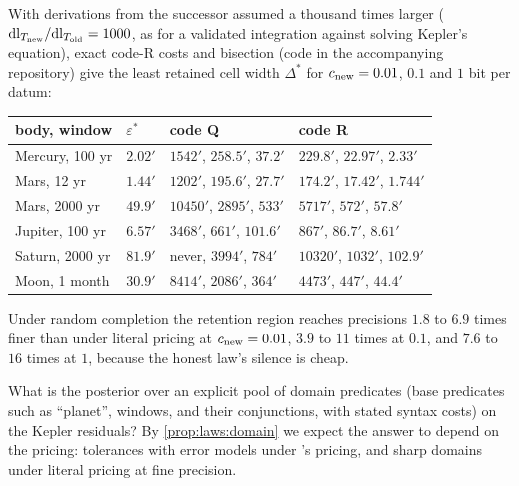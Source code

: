 With derivations from the successor assumed a thousand times larger ($\mathrm{dl}_{T_{\rm new}}/\mathrm{dl}_{T_{\rm old}}=1000$, as for a validated integration against solving Kepler's equation), exact code-R costs and bisection (code in the accompanying repository) give the least retained cell width $\Delta^*$ for $c_{\rm new}=0.01$, $0.1$ and $1$ bit per datum:
\begin{center}\small
\begin{tabular}{llll}
\toprule
body, window & $\varepsilon^*$ & code Q & code R\\
\midrule
Mercury, 100 yr & $2.02'$ & $1542'$, $258.5'$, $37.2'$ & $229.8'$, $22.97'$, $2.33'$\\
Mars, 12 yr & $1.44'$ & $1202'$, $195.6'$, $27.7'$ & $174.2'$, $17.42'$, $1.744'$\\
Mars, 2000 yr & $49.9'$ & $10450'$, $2895'$, $533'$ & $5717'$, $572'$, $57.8'$\\
Jupiter, 100 yr & $6.57'$ & $3468'$, $661'$, $101.6'$ & $867'$, $86.7'$, $8.61'$\\
Saturn, 2000 yr & $81.9'$ & never, $3994'$, $784'$ & $10320'$, $1032'$, $102.9'$\\
Moon, 1 month & $30.9'$ & $8414'$, $2086'$, $364'$ & $4473'$, $447'$, $44.4'$\\
\bottomrule
\end{tabular}
\end{center}
Under random completion the retention region reaches precisions $1.8$ to $6.9$ times finer than under literal pricing at $c_{\rm new}=0.01$, $3.9$ to $11$ times at $0.1$, and $7.6$ to $16$ times at $1$, because the honest law's silence is cheap.

\begin{question}\label{q:laws:domains}
What is the posterior over an explicit pool of domain predicates (base predicates such as ``planet'', windows, and their conjunctions, with stated syntax costs) on the Kepler residuals? By \cref{prop:laws:domain} we expect the answer to depend on the pricing: tolerances with error models under \SAIabbr's pricing, and sharp domains under literal pricing at fine precision.
\end{question}

